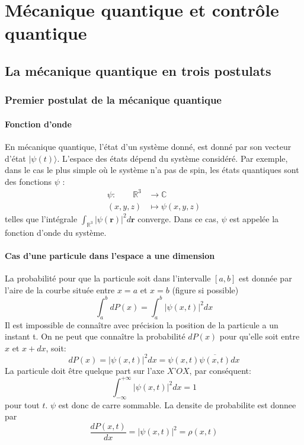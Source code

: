 \chapter{Mécanique quantique et contrôle quantique}

\section{La mécanique quantique en trois postulats}
\subsection{Premier postulat de la mécanique quantique}
\subsubsection{Fonction d'onde}
En mécanique quantique, l'état d'un système donné, est donné par son vecteur d'état $|\psi (t)\rangle$. 
L'espace des états dépend du système considéré. Par exemple, dans le cas le plus simple où le système n'a pas de spin, les états quantiques sont des fonctions $\psi$ :
$$
\begin{aligned}
	\psi :\quad \quad \mathbb {R} ^{3}&\rightarrow \mathbb{C} \\(x,y,z)&\mapsto \psi (x,y,z)
\end{aligned}
$$
telles que l'intégrale  $\int _{\mathbb{R} ^{3}}|\psi (\mathbf{r} )|^{2}d\mathbf{r}$ converge. Dans ce cas, $\psi$ est appelée la fonction d'onde du système.
\subsubsection{Cas d’une particule dans l’espace a une dimension}
La probabilité pour que la particule soit dans l’intervalle $[a,b]$ est donnée par l’aire de la courbe située entre $x=a$ et $x=b$ (figure si possible)
\begin{equation}
\int_a^b dP(x)= \int_a^b |\psi(x,t)|^2dx
\end{equation}
Il est impossible de connaître avec précision la position de la particule a un instant t. On ne peut que connaître la probabilité $dP(x)$ pour qu’elle soit entre $x$ et $x+dx$, soit:
\begin{equation}
dP(x)=|\psi(x,t)|^2dx=\psi(x,t)\overline{\psi(x,t)}dx
\end{equation}
La particule doit être quelque part sur l’axe $X’OX$, par conséquent:
\begin{equation}
\int_{-\infty}^{+\infty}|\psi(x,t)|^2dx=1
\end{equation}
pour tout $t$. $\psi$ est donc de carre sommable.
La densite de probabilite est donnee par
\begin{equation}
\dfrac{dP(x,t)}{dx}=|\psi(x,t)|^2=\rho(x,t)
\end{equation}

